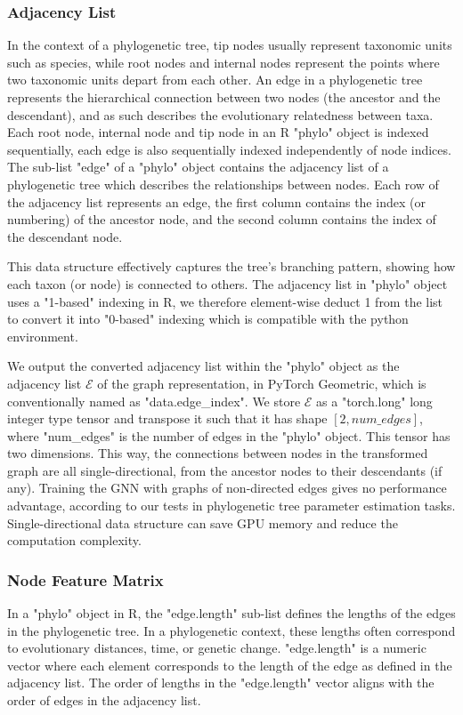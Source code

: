 {\subsubsection{Adjacency List}
\label{appendix::data_transform::phylo_gnn::adj_list}
In the context of a phylogenetic tree, tip nodes usually represent taxonomic units such as species, while root nodes and internal nodes represent the points where two taxonomic units depart from each other. An edge in a phylogenetic tree represents the hierarchical connection between two nodes (the ancestor and the descendant), and as such describes the evolutionary relatedness between taxa. Each root node, internal node and tip node in an R "phylo" object is indexed sequentially, each edge is also sequentially indexed independently of node indices. The sub-list "edge" of a "phylo" object contains the adjacency list of a phylogenetic tree which describes the relationships between nodes. Each row of the adjacency list represents an edge, the first column contains the index (or numbering) of the ancestor node, and the second column contains the index of the descendant node.

This data structure effectively captures the tree's branching pattern, showing how each taxon (or node) is connected to others. The adjacency list in "phylo" object uses a "1-based" indexing in R, we therefore element-wise deduct 1 from the list to convert it into "0-based" indexing which is compatible with the python environment. 

We output the converted adjacency list within the "phylo" object as the adjacency list $\mathcal{E}$ of the graph representation, in PyTorch Geometric, which is conventionally named as "data.edge\_index". We store $\mathcal{E}$ as a "torch.long" long integer type tensor and transpose it such that it has shape $[2, num\_edges]$, where "num\_edges" is the number of edges in the "phylo" object. This tensor has two dimensions. This way, the connections between nodes in the transformed graph are all single-directional, from the ancestor nodes to their descendants (if any). Training the GNN with graphs of non-directed edges gives no performance advantage, according to our tests in phylogenetic tree parameter estimation tasks. Single-directional data structure can save GPU memory and reduce the computation complexity.

\subsubsection{Node Feature Matrix}
\label{appendix::data_transform::phylo_gnn::node_features}
In a "phylo" object in R, the "edge.length" sub-list defines the lengths of the edges in the phylogenetic tree. In a phylogenetic context, these lengths often correspond to evolutionary distances, time, or genetic change. "edge.length" is a numeric vector where each element corresponds to the length of the edge as defined in the adjacency list. The order of lengths in the "edge.length" vector aligns with the order of edges in the adjacency list.

}

